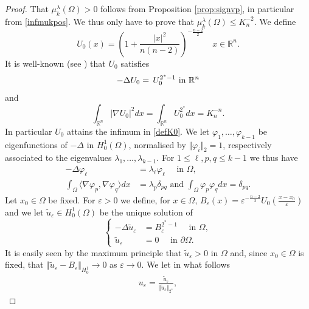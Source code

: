 \documentclass[10pt]{amsart}
\numberwithin{equation}{section}
\newcommand{\R}{\mathbb{R}}
\newcommand{\ve}{\varepsilon}
\newcommand{\vp}{\varphi}
\newcommand{\Om}{\Omega}
\newcommand{\mkl}{\mu_{k}^{\lambda}}
\def \rr {\mathbb{R}}
\theoremstyle{plain}
\theoremstyle{remark}
\begin{document}
\begin{proof}
That $\mkl(\Om) >0$  follows from Proposition \ref{prop:signvp}, in particular from \eqref{infmukpos}. We thus only have to prove that $\mkl(\Om) \le K_n^{-2}$. We define 
\begin{equation} \label{defU0}
U_0(x)=\left(1+\frac{|x|^2}{n(n-2)} \right)^{-\frac{n-2}{2}} \quad x \in \R^n.
\end{equation}
It is well-known (see \cite{Aub, Talenti}) that $U_0$ satisfies 
\begin{equation}\label{critUp}
	-\Delta U_0 = \, U_0^{2^*-1} \hbox{ in } \rr^n
\end{equation}
and
\begin{equation} \label{energieU0}
\int_{\R^n} |\nabla U_0|^2dx = \int_{\R^n} U_0^{2^*} dx = K_n^{-n}.
\end{equation}
 In particular $U_0$ attains the infimum in \eqref{defK0}. We let $\vp_1, \dots, \vp_{k-1}$ be eigenfunctions of $-\Delta$ in $H^1_0(\Omega)$, normalised by $\Vert \vp_i \Vert_2 = 1$, respectively associated to the eigenvalues $\lambda_1, \dots, \lambda_{k-1}$. For $1 \le \ell,p,q \le k-1$ we thus have 
 \begin{equation*} 
 \begin{aligned}   
 - \Delta \vp_\ell & =  \lambda_\ell \vp_\ell \quad \text{ in } \Om, \\
  	\int_{\Om} \langle \nabla \vp_p, \nabla \vp_q \rangle dx & = \lambda_p \delta_{pq} \text{ and }  \int_\Om \varphi_{p} \varphi_{q} dx =  \delta_{pq}.
 \end{aligned} 
 \end{equation*}
Let $x_0 \in \Om$ be fixed. For $\ve >0$ we define, for $x \in \Omega$, $B_{\ve}(x)	=  \ve^{- \frac{n-2}{2}} U_0\left( \frac{x-x_0}{\ve}\right) $ and we let $\tilde{u}_\ve \in H^1_0(\Om)$ be the unique solution of 
$$ \left \{ \begin{aligned}
- \Delta \tilde{u}_\ve & = B_{\ve}^{2^*-1} \quad \text{ in } \Om, \\
 \tilde{u}_\ve & = 0 \quad \text{ in } \partial \Om. 
\end{aligned} \right.$$
It is easily seen by the maximum principle that $\tilde{u}_\ve >0$ in $\Om$ and, since $x_0 \in \Om$ is fixed, that $\Vert \tilde{u}_\ve - B_\ve \Vert_{H^1_0} \to 0$ as $\ve \to 0$. We let in what follows
\begin{equation*}
\begin{aligned}
u_\ve = \frac{\tilde{u}_{\ve}}{\Vert \tilde{u}_\ve \Vert_{2^*}},
	\end{aligned} 

\end{equation*}
\end{proof}
\end{document}
